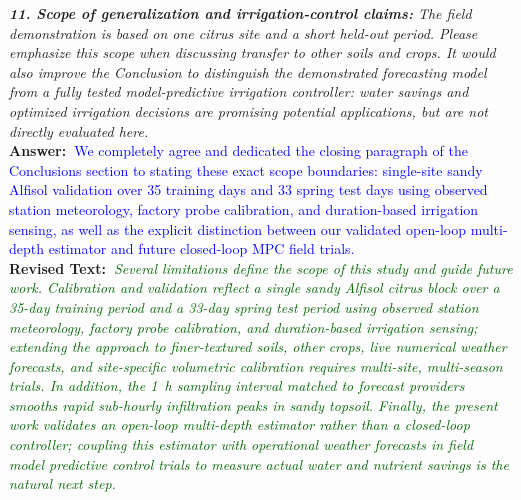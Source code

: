 \documentclass[10pt]{article}
\newcommand{\query}[2][]{\ifthenelse{\equal{#1}{}}{}{\textbf{#1:}~}\emph{#2}}
\newcommand{\ans}[1]{\textbf{Answer:~}#1}
\newcommand{\Rtext}[1]{\textbf{Revised Text:~}#1}
\begin{document}
\query[R-2.11]{\textbf{11. Scope of generalization and irrigation-control claims:} The field demonstration is based on one citrus site and a short held-out period. Please emphasize this scope when discussing transfer to other soils and crops. It would also improve the Conclusion to distinguish the demonstrated forecasting model from a fully tested model-predictive irrigation controller: water savings and optimized irrigation decisions are promising potential applications, but are not directly evaluated here.}\\
\ans{\textcolor{blue}{We completely agree and dedicated the closing paragraph of the Conclusions section to stating these exact scope boundaries: single-site sandy Alfisol validation over 35 training days and 33 spring test days using observed station meteorology, factory probe calibration, and duration-based irrigation sensing, as well as the explicit distinction between our validated open-loop multi-depth estimator and future closed-loop MPC field trials.}}\\
\Rtext{\emph{\textcolor{darkgreen}{Several limitations define the scope of this study and guide future work. Calibration and validation reflect a single sandy Alfisol citrus block over a 35-day training period and a 33-day spring test period using observed station meteorology, factory probe calibration, and duration-based irrigation sensing; extending the approach to finer-textured soils, other crops, live numerical weather forecasts, and site-specific volumetric calibration requires multi-site, multi-season trials. In addition, the \SI{1}{h} sampling interval matched to forecast providers smooths rapid sub-hourly infiltration peaks in sandy topsoil. Finally, the present work validates an open-loop multi-depth estimator rather than a closed-loop controller; coupling this estimator with operational weather forecasts in field model predictive control trials to measure actual water and nutrient savings is the natural next step.}}}
\end{document}
